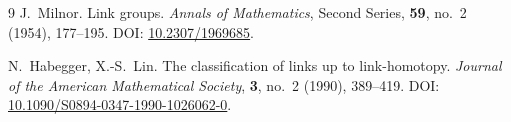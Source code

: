 \documentclass[11pt,a4paper]{article}
\theoremstyle{definition}
\theoremstyle{remark}
\begin{document}
\begin{thebibliography}{9}
J.~Milnor.
\newblock Link groups.
\newblock \emph{Annals of Mathematics}, Second Series,
\textbf{59}, no.~2 (1954), 177--195.
\newblock DOI:
\href{https://doi.org/10.2307/1969685}{10.2307/1969685}.

N.~Habegger, X.-S.~Lin.
\newblock The classification of links up to link-homotopy.
\newblock \emph{Journal of the American Mathematical Society},
\textbf{3}, no.~2 (1990), 389--419.
\newblock DOI:
\href{https://doi.org/10.1090/S0894-0347-1990-1026062-0}
{10.1090/S0894-0347-1990-1026062-0}.
\end{thebibliography}
\end{document}
